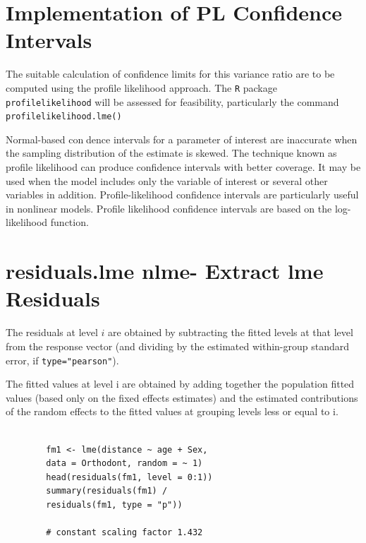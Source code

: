 \documentclass[12pt, a4paper]{report}
\theoremstyle{plain}
\theoremstyle{definition}
\theoremstyle{remark}
\begin{document}
	\section{Implementation of PL Confidence Intervals}
	
	The suitable calculation of confidence limits for this variance ratio are to be computed using the profile likelihood approach. The \texttt{R} package \texttt{profilelikelihood} will be assessed for feasibility, particularly the command \texttt{profilelikelihood.lme()}
	
	
	Normal-based condence intervals for a parameter of interest are inaccurate when the sampling 
	distribution of the estimate is skewed. The technique known as profile likelihood can produce confidence 
	intervals with better coverage. It may be used when the model includes only the variable of interest or 
	several other variables in addition.
	Profile-likelihood confidence intervals are particularly useful in nonlinear models. 
	Profile likelihood confidence intervals are based on the log-likelihood function.
	
	
	
	
	
	
	\section{residuals.lme {nlme}- Extract lme Residuals}
	
	The residuals at level $i$ are obtained by subtracting the fitted levels at that level from the response vector (and dividing by the estimated within-group standard error, if \texttt{type="pearson"}). 
	
	The fitted values at level i are obtained by adding together the population fitted values (based only on the fixed effects estimates) and the estimated contributions of the random effects to the fitted values at grouping levels less or equal to i.
	
	
	\begin{framed}
		\begin{verbatim}
		
		fm1 <- lme(distance ~ age + Sex, 
		data = Orthodont, random = ~ 1)
		head(residuals(fm1, level = 0:1))
		summary(residuals(fm1) /
		residuals(fm1, type = "p")) 
		
		# constant scaling factor 1.432
		
		\end{verbatim}
	\end{framed}
	
\end{document}
